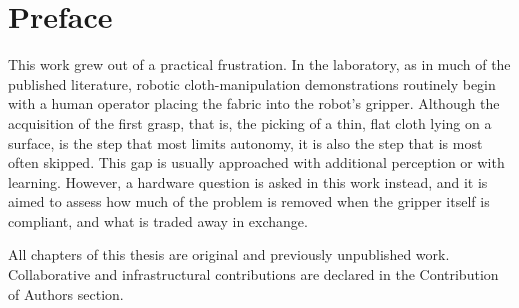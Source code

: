 \chapter*{\rm\bfseries Preface}
\label{ch:preface}

This work grew out of a practical frustration. In the laboratory, as in
much of the published literature, robotic cloth-manipulation
demonstrations routinely begin with a human operator placing the fabric
into the robot's gripper. Although the acquisition of the first grasp,
that is, the picking of a thin, flat cloth lying on a surface, is the
step that most limits autonomy, it is also the step that is most often
skipped. This gap is usually approached with additional perception or
with learning. However, a hardware question is asked in this work
instead, and it is aimed to assess how much of the problem is removed
when the gripper itself is compliant, and what is traded away in
exchange.

All chapters of this thesis are original and previously unpublished
work. Collaborative and infrastructural contributions are declared in
the Contribution of Authors section.
